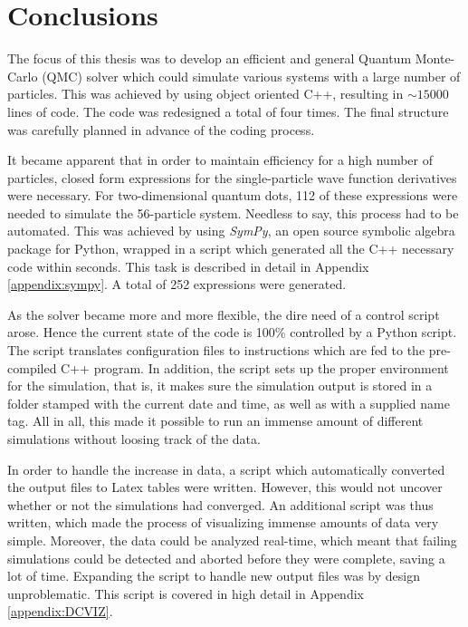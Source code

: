 \chapter{Conclusions}

The focus of this thesis was to develop an efficient and general Quantum Monte-Carlo (QMC) solver which could simulate various systems with a large number of particles. This was achieved by using object oriented C++, resulting in $\sim15000$ lines of code. The code was redesigned a total of four times. The final structure was carefully planned in advance of the coding process.

It became apparent that in order to maintain efficiency for a high number of particles, closed form expressions for the single-particle wave function derivatives were necessary. For two-dimensional quantum dots, 112 of these expressions were needed to simulate the 56-particle system. Needless to say, this process had to be automated. This was achieved by using \textit{SymPy}, an open source symbolic algebra package for Python, wrapped in a script which generated all the C++ necessary code within seconds. This task is described in detail in Appendix \ref{appendix:sympy}. A total of 252 expressions were generated.

As the solver became more and more flexible, the dire need of a control script arose. Hence the current state of the code is 100\% controlled by a Python script. The script translates configuration files to instructions which are fed to the pre-compiled C++ program. In addition, the script sets up the proper environment for the simulation, that is, it makes sure the simulation output is stored in a folder stamped with the current date and time, as well as with a supplied name tag. All in all, this made it possible to run an immense amount of different simulations without loosing track of the data.

In order to handle the increase in data, a script which automatically converted the output files to Latex tables were written. However, this would not uncover whether or not the simulations had converged. An additional script was thus written, which made the process of visualizing immense amounts of data very simple. Moreover, the data could be analyzed real-time, which meant that failing simulations could be detected and aborted before they were complete, saving a lot of time. Expanding the script to handle new output files was by design unproblematic. This script is covered in high detail in Appendix \ref{appendix:DCVIZ}.


